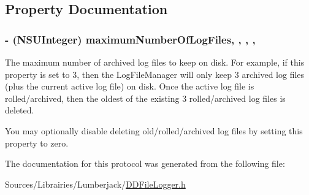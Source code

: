 \subsection{Property Documentation}
\hypertarget{protocol_d_d_log_file_manager-p_acb282ecd7fa74b5c3ee03bbb7a710dc1}{
\subsubsection[{maximum\-Number\-Of\-Log\-Files}]{\setlength{\rightskip}{0pt plus 5cm}-\/ (N\-S\-U\-Integer) maximum\-Number\-Of\-Log\-Files\hspace{0.3cm}{\ttfamily [read]}, {\ttfamily [write]}, {\ttfamily [required]}, {\ttfamily [atomic]}, {\ttfamily [assign]}}}\label{protocol_d_d_log_file_manager-p_acb282ecd7fa74b5c3ee03bbb7a710dc1}
The maximum number of archived log files to keep on disk. For example, if this property is set to 3, then the Log\-File\-Manager will only keep 3 archived log files (plus the current active log file) on disk. Once the active log file is rolled/archived, then the oldest of the existing 3 rolled/archived log files is deleted.

You may optionally disable deleting old/rolled/archived log files by setting this property to zero. 

The documentation for this protocol was generated from the following file\-:\begin{DoxyCompactItemize}
\item 
Sources/\-Librairies/\-Lumberjack/\hyperlink{_d_d_file_logger_8h}{D\-D\-File\-Logger.\-h}\end{DoxyCompactItemize}
